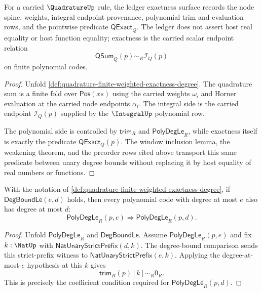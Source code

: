 \begin{theorem}
\label{thm:quadrature-ledger-exactness-obligation}
For a carried $\QuadratureUp$ rule, the ledger exactness surface records the node spine, weights, integral endpoint provenance, polynomial trim and evaluation rows, and the pointwise predicate $\mathsf{QExact}_Q$. The ledger does not assert host real equality or host function equality; exactness is the carried scalar endpoint relation
$$
\mathsf{QSum}_Q(p)\sim_R\mathcal I_Q(p)
$$
on finite polynomial codes.
\end{theorem}
\begin{proof}
Unfold \autoref{def:quadrature-finite-weighted-exactness-degree}. The quadrature sum is a finite fold over $\mathsf{Pos}(xs)$ using the carried weights $\omega_i$ and Horner evaluation at the carried node endpoints $\alpha_i$. The integral side is the carried endpoint $\mathcal I_Q(p)$ supplied by the $\IntegralUp$ polynomial row.

The polynomial side is controlled by $\mathsf{trim}_R$ and $\mathsf{PolyDegLe}_R$, while exactness itself is exactly the predicate $\mathsf{QExact}_Q(p)$. The window inclusion lemma, the weakening theorem, and the preorder rows cited above transport this same predicate between unary degree bounds without replacing it by host equality of real numbers or functions.
\end{proof}

\begin{lemma}
\label{lem:quadrature-polynomial-degree-window-inclusion}
With the notation of \autoref{def:quadrature-finite-weighted-exactness-degree}, if $\mathsf{DegBoundLe}(e,d)$ holds, then every polynomial code with degree at most $e$ also has degree at most $d$:
$$
\mathsf{PolyDegLe}_R(p,e)
\Longrightarrow
\mathsf{PolyDegLe}_R(p,d).
$$
\end{lemma}
\begin{proof}
Unfold $\mathsf{PolyDegLe}_R$ and $\mathsf{DegBoundLe}$. Assume $\mathsf{PolyDegLe}_R(p,e)$ and fix $k:\NatUp$ with $\mathsf{NatUnaryStrictPrefix}(d,k)$. The degree-bound comparison sends this strict-prefix witness to $\mathsf{NatUnaryStrictPrefix}(e,k)$. Applying the degree-at-most-$e$ hypothesis at this $k$ gives
$$
\mathsf{trim}_R(p)[k]\sim_R0_R.
$$
This is precisely the coefficient condition required for $\mathsf{PolyDegLe}_R(p,d)$.
\end{proof}

